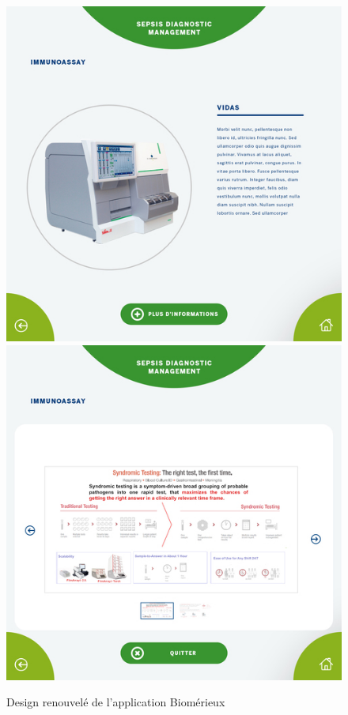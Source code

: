 \begin{figure}[h]
    \includegraphics[scale=0.195]{img/resized-bmx-3-new.jpg}
    \includegraphics[scale=0.195]{img/resized-bmx-4-new.jpg}
    \caption{Design renouvelé de l'application Biomérieux}
\end{figure}

